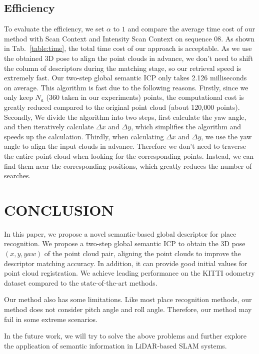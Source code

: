 \documentclass[letterpaper, 10 pt, conference]{ieeeconf}
\begin{document}
\subsection{Efficiency}
To evaluate the efficiency, we set $\alpha$ to $1$ and compare the average time cost of our method with Scan Context and Intensity Scan Context on sequence 08. As shown in Tab.~\ref{table:time}, the total time cost of our approach is acceptable. As we use the obtained 3D pose to align the point clouds in advance, we don't need to shift the column of descriptors during the matching stage, so our retrieval speed is extremely fast. Our two-step global semantic ICP only takes 2.126 milliseconds on average. This algorithm is fast due to the following reasons. Firstly, since we only keep \(N_a\) (360 taken in our experiments) points, the computational cost is greatly reduced compared to the original point cloud (about 120,000 points). Secondly, We divide the algorithm into two steps, first calculate the yaw angle, and then iteratively calculate $\Delta x$ and $\Delta y$, which simplifies the algorithm and speeds up the calculation. Thirdly, when calculating $\Delta x$ and $\Delta y$, we use the yaw angle to align the input clouds in advance. Therefore we don’t need to traverse the entire point cloud when looking for the corresponding points. Instead, we can find them near the corresponding positions, which greatly reduces the number of searches.


\section{CONCLUSION}
In this paper, we propose a novel semantic-based global descriptor for place recognition. We propose a two-step global semantic ICP to obtain the 3D pose \((x,y,yaw)\) of the point cloud pair, aligning the point clouds to improve the descriptor matching accuracy. In addition, it can provide good initial values for point cloud registration. We achieve leading performance on the KITTI odometry dataset compared to the state-of-the-art methods. 

Our method also has some limitations. Like most place recognition methods, our method does not consider pitch angle and roll angle. Therefore, our method may fail in some extreme scenarios.

In the future work, we will try to solve the above problems and further explore the application of semantic information in LiDAR-based SLAM systems.









\end{document}
